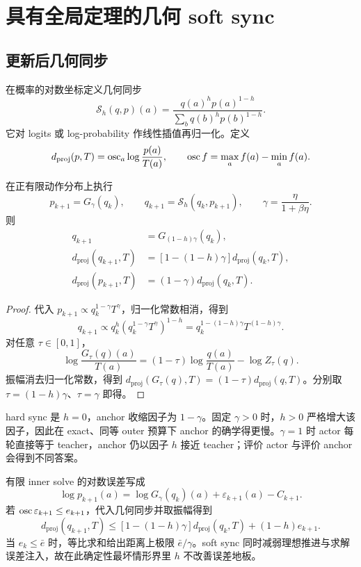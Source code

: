 \section{具有全局定理的几何 soft sync}

\subsection{更新后几何同步}

在概率的对数坐标定义几何同步
\[
 \mathcal S_h(q,p)(a)=\frac{q(a)^hp(a)^{1-h}}
 {\sum_bq(b)^hp(b)^{1-h}}.
\]
它对 logits 或 log-probability 作线性插值再归一化。定义
\[
 d_{\mathrm{proj}}(p,T)=\operatorname{osc}_a\log\frac{p(a)}{T(a)},
 \qquad\operatorname{osc} f=\max_af(a)-\min_af(a).
\]

\begin{theorem}
\label{thm:ema-geometric-exact}
在正有限动作分布上执行
\[
 p_{k+1}=G_\gamma(q_k),\qquad
 q_{k+1}=\mathcal S_h(q_k,p_{k+1}),\qquad
 \gamma=\frac{\eta}{1+\beta\eta}.
\]
则
\begin{align}
 q_{k+1}&=G_{(1-h)\gamma}(q_k),\\
 d_{\mathrm{proj}}(q_{k+1},T)
 &=[1-(1-h)\gamma]d_{\mathrm{proj}}(q_k,T),\\
 d_{\mathrm{proj}}(p_{k+1},T)
 &=(1-\gamma)d_{\mathrm{proj}}(q_k,T).
\end{align}
\end{theorem}
\begin{proof}
代入 $p_{k+1}\propto q_k^{1-\gamma}T^\gamma$，归一化常数相消，得到
\[
 q_{k+1}\propto q_k^h(q_k^{1-\gamma}T^\gamma)^{1-h}
 =q_k^{1-(1-h)\gamma}T^{(1-h)\gamma}.
\]
对任意 $\tau\in[0,1]$，
\[
 \log\frac{G_\tau(q)(a)}{T(a)}
 =(1-\tau)\log\frac{q(a)}{T(a)}-\log Z_\tau(q).
\]
振幅消去归一化常数，得到 $d_{\mathrm{proj}}(G_\tau(q),T)=(1-\tau)d_{\mathrm{proj}}(q,T)$。分别取 $\tau=(1-h)\gamma$、$\tau=\gamma$ 即得。
\end{proof}

hard sync 是 $h=0$，anchor 收缩因子为 $1-\gamma$。固定 $\gamma>0$ 时，$h>0$ 严格增大该因子，因此在 exact、同等 outer 预算下 anchor 的确学得更慢。$\gamma=1$ 时 actor 每轮直接等于 teacher，anchor 仍以因子 $h$ 接近 teacher；评价 actor 与评价 anchor 会得到不同答案。

有限 inner solve 的对数误差写成
\[
 \log p_{k+1}(a)=\log G_\gamma(q_k)(a)
 +\varepsilon_{k+1}(a)-C_{k+1}.
\]
若 $\operatorname{osc}\varepsilon_{k+1}\le e_{k+1}$，代入几何同步并取振幅得到
\[
 d_{\mathrm{proj}}(q_{k+1},T)
 \le[1-(1-h)\gamma]d_{\mathrm{proj}}(q_k,T)+(1-h)e_{k+1}.
\]
当 $e_k\le\bar e$ 时，等比求和给出距离上极限 $\bar e/\gamma$。soft sync 同时减弱理想推进与求解误差注入，故在此确定性最坏情形界里 $h$ 不改善误差地板。

